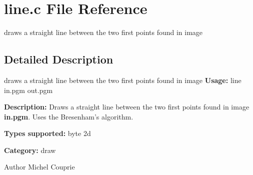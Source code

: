 \section{line.c File Reference}
\label{line_8c}


draws a straight line between the two first points found in image  




\subsection{Detailed Description}
draws a straight line between the two first points found in image {\bfseries Usage:} line in.pgm out.pgm

{\bfseries Description:} Draws a straight line between the two first points found in image {\bfseries in.pgm}. Uses the Bresenham's algorithm.

{\bfseries Types supported:} byte 2d

{\bfseries Category:} draw

\begin{DoxyAuthor}{Author}
Michel Couprie 
\end{DoxyAuthor}
